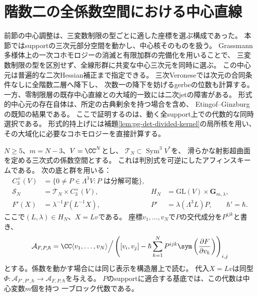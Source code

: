 \section{階数二の全係数空間における中心直線}
\label{sec:pg-intrinsic-rank-two-center}
前節の中心調整は、三変数制限の型ごとに適した座標を選ぶ構成であった。
本節ではsupportの三次元部分空間を動かし、中心核そのものを扱う。
Grassmann多様体上の一次コホモロジーの消滅と有限加群の完備化を用いることで、
三変数制限の型を区別せず、全線形群に共変な中心三次元を同時に選ぶ。
この中心元は普遍的な二次Hessian補正まで指定できる。
三次Veroneseでは次元の合同条件なしに全階数二層へ降下し、
次数一の降下を妨げるgerbeの位数も計算する。
一方、零制限層の既存中心直線との大域的一致には二次jetの障害がある。
形式的中心元の存在自体は、所定の古典剰余を持つ場合を含め、
Etingof--Ginzburg\cite[Proposition~8.1.1(i), pp.~1407--1408]{EG}の既知の結果である。
ここで証明するのは、動く全support上での代数的な同時選択である。
形式的持上げには補題\ref{lem:pg-det-divided-kernel}の局所核を用い、
その大域化に必要なコホモロジーを直接計算する。

$N\ge5$、$m=N-3$、$V=\CC^N$とし、
$\mathcal T_N\subset\operatorname{Sym}^3V^*$を、
滑らかな射影超曲面を定める三次式の係数空間とする。
これは判別式を可逆にしたアフィンスキームである。
次の底と群を用いる：
\begin{equation}
 \begin{aligned}
 C_3^\times(V)&=
 \{0\ne P\in\Lambda^3V:P\text{ は分解可能}\},\\
 \mathcal S_N&=\mathcal T_N\times C_3^\times(V),
 &H_N&=\mathrm{GL}(V)\times\mathbf G_{m,\lambda},\\
 F'(X)&=\lambda^{-1}F(L^{-1}X),
 &P'&=\lambda(\Lambda^3L)P,\qquad \hbar'=\hbar.
 \end{aligned}
 \label{eq:pg-intrinsic-rank-two-parameters}
\end{equation}
ここで$(L,\lambda)\in H_N$、$X=Lv$である。
座標$v_1,\ldots,v_N$で$P$の交代成分を$P^{ijk}$と書き、
\begin{equation}
 \mathcal A_{F,P,\hbar}
 =\CC\langle v_1,\ldots,v_N\rangle\Big/
 \left(
 [v_i,v_j]-\hbar\sum_{k=1}^N
 P^{ijk}\sym\left(\frac{\partial F}{\partial v_k}\right)
 \right)_{i,j}
 \label{eq:pg-intrinsic-rank-two-algebra}
\end{equation}
とする。係数を動かす場合には同じ表示を構造層上で読む。
代入$X=Lv$は同型
$\Phi:\mathcal A_{F',P',\hbar}\to\mathcal A_{F,P,\hbar}$を与える。
$P$のsupportに適合する基底では、この代数は中心変数$m$個を持つ
一ブロック代数である。

